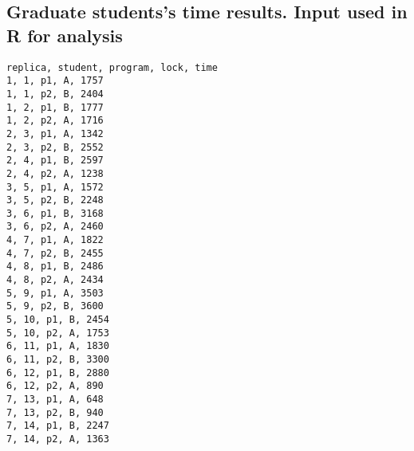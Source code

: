 \begin{appendices}
\chapter{Graduate students's time results. Input used in R for analysis}
\noindent
\begin{verbatim}
replica, student, program, lock, time
1, 1, p1, A, 1757
1, 1, p2, B, 2404
1, 2, p1, B, 1777
1, 2, p2, A, 1716
2, 3, p1, A, 1342
2, 3, p2, B, 2552
2, 4, p1, B, 2597
2, 4, p2, A, 1238
3, 5, p1, A, 1572
3, 5, p2, B, 2248
3, 6, p1, B, 3168
3, 6, p2, A, 2460
4, 7, p1, A, 1822
4, 7, p2, B, 2455
4, 8, p1, B, 2486
4, 8, p2, A, 2434
5, 9, p1, A, 3503
5, 9, p2, B, 3600
5, 10, p1, B, 2454
5, 10, p2, A, 1753
6, 11, p1, A, 1830
6, 11, p2, B, 3300
6, 12, p1, B, 2880
6, 12, p2, A, 890
7, 13, p1, A, 648
7, 13, p2, B, 940
7, 14, p1, B, 2247
7, 14, p2, A, 1363
\end{verbatim}



\end{appendices}